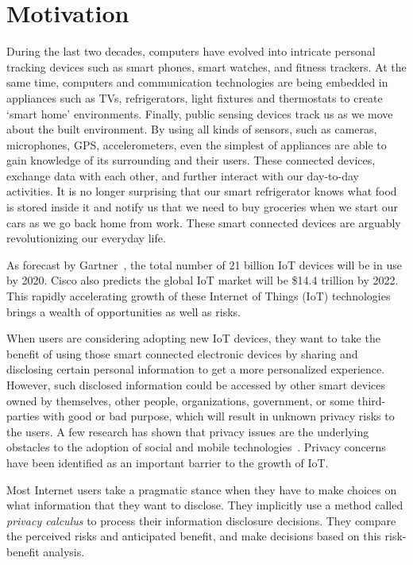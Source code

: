 \chapter{Motivation}\label{chapter:intro}
 
During the last two decades, computers have evolved into intricate personal tracking devices such as smart phones, smart watches, and fitness trackers. At the same time, computers and communication technologies are being embedded in appliances such as TVs, refrigerators, light fixtures and thermostats to create `smart home' environments. Finally, public sensing devices track us as we move about the built environment. By using all kinds of sensors, such as cameras, microphones, GPS, accelerometers, even the simplest of appliances are able to gain knowledge of its surrounding and their users. These connected devices, exchange data with each other, and further interact with our day-to-day activities. It is no longer surprising that our smart refrigerator knows what food is stored inside it and notify us that we need to buy groceries when we start our cars as we go back home from work. These smart connected devices are arguably revolutionizing our everyday life.

As forecast by Gartner~\cite{van_der_meulen_gartner_nodate}, the total number of 21 billion IoT devices will be in use by 2020. Cisco also predicts the global IoT market will be \$14.4 trillion by 2022. This rapidly accelerating growth of these Internet of Things (IoT) technologies brings a wealth of opportunities as well as risks. 

When users are considering adopting new IoT devices, they want to take the benefit of using those smart connected electronic devices by sharing and disclosing certain personal information to get a more personalized experience. However, such disclosed information could be accessed by other smart devices owned by themselves, other people, organizations, government, or some third-parties with good or bad purpose, which will result in unknown privacy risks to the users. A few research has shown that privacy issues are the underlying obstacles to the adoption of social and mobile technologies~\cite{}. Privacy concerns have been identified as an important barrier to the growth of IoT.

Most Internet users take a pragmatic stance when they have to make choices on what information that they want to disclose. They implicitly use a method called \textit{privacy calculus} to process their information disclosure decisions. They compare the perceived risks and anticipated benefit, and make decisions based on this risk-benefit analysis.

